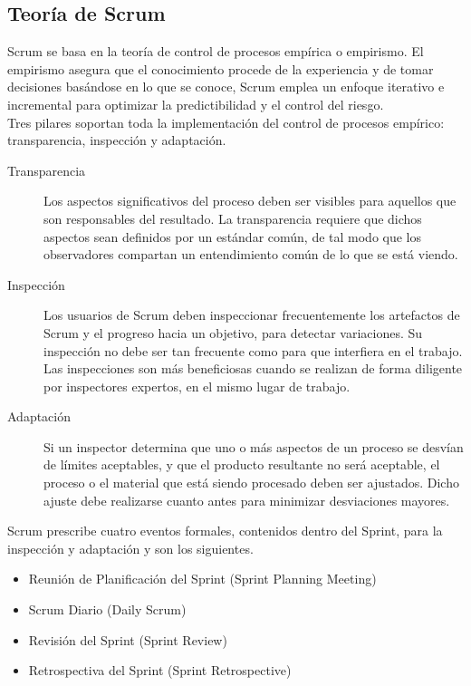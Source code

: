 \subsection{Teoría de Scrum}
Scrum se basa en la teoría de control de procesos empírica o empirismo. El empirismo asegura que el conocimiento procede de la experiencia y de tomar decisiones basándose en lo que se conoce, Scrum emplea un enfoque iterativo e incremental para optimizar la predictibilidad y el control del riesgo. \\

Tres pilares soportan toda la implementación del control de procesos empírico: transparencia, inspección y adaptación. \cite{ref3} \\
\begin{description}
	\item[Transparencia]  Los aspectos significativos del proceso deben ser visibles para aquellos que son responsables del resultado. La transparencia requiere que dichos aspectos sean definidos por un estándar común, de tal modo que los observadores compartan un entendimiento común de lo que se está viendo.
	\item[Inspección] Los usuarios de Scrum deben inspeccionar frecuentemente los artefactos de Scrum y el progreso hacia un objetivo, para detectar variaciones. Su inspección no debe ser tan frecuente como para que interfiera en el trabajo. Las inspecciones son más beneficiosas cuando se realizan de forma diligente por inspectores expertos, en el mismo lugar de trabajo.
	\item[Adaptación] Si un inspector determina que uno o más aspectos de un proceso se desvían de límites aceptables, y que el producto resultante no será aceptable, el proceso o el material que está siendo procesado deben ser ajustados. Dicho ajuste debe realizarse cuanto antes para minimizar desviaciones mayores.
\end{description}

Scrum prescribe cuatro eventos formales, contenidos dentro del Sprint, para la inspección y adaptación y son los siguientes.
  \begin{itemize}
	\item Reunión de Planificación del Sprint (Sprint Planning Meeting)
	\item Scrum Diario (Daily Scrum)
	\item Revisión del Sprint (Sprint Review)
	\item Retrospectiva del Sprint (Sprint Retrospective)
  \end{itemize}
  
